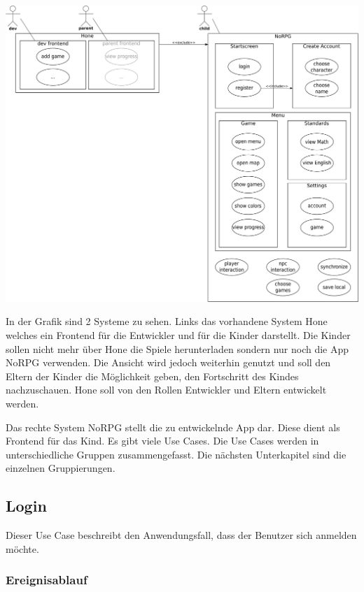 	\begin{center}
		\includegraphics[width=\textwidth]{pics/OUCD.pdf}
	\end{center}
	
	In der Grafik sind 2 Systeme zu sehen. Links das vorhandene System Hone welches ein Frontend für die Entwickler und für die Kinder darstellt. Die Kinder sollen nicht mehr über Hone die Spiele herunterladen sondern nur noch die App NoRPG verwenden. Die Ansicht wird jedoch weiterhin genutzt und soll den Eltern der Kinder die Möglichkeit geben, den Fortschritt des Kindes nachzuschauen. Hone soll von den Rollen Entwickler und Eltern entwickelt werden.
	
	Das rechte System NoRPG stellt die zu entwickelnde App dar. Diese dient als Frontend für das Kind. Es gibt viele Use Cases. Die Use Cases werden in unterschiedliche Gruppen zusammengefasst. Die nächsten Unterkapitel sind die einzelnen Gruppierungen.
	
	\subsection{Login}
		Dieser Use Case beschreibt den Anwendungsfall, dass der Benutzer sich anmelden möchte.
			
		\subsubsection{Ereignisablauf}
			
